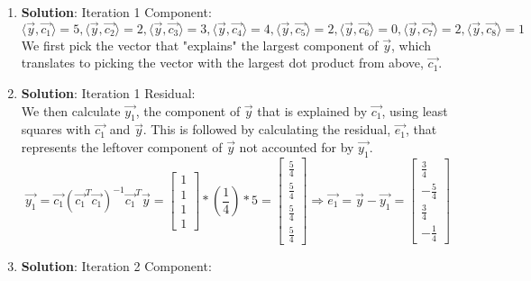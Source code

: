 \documentclass[11pt,letterpaper]{article}
\begin{document}
\begin{enumerate}
    \item \textbf{Solution}: Iteration 1 Component:
        \begin{equation*}
            \langle\vec{y},\vec{c_{1}}\rangle = 5,        \langle\vec{y},\vec{c_{2}}\rangle = 2,
            \langle\vec{y},\vec{c_{3}}\rangle = 3,
            \langle\vec{y},\vec{c_{4}}\rangle = 4,
            \langle\vec{y},\vec{c_{5}}\rangle = 2,
            \langle\vec{y},\vec{c_{6}}\rangle = 0,
            \langle\vec{y},\vec{c_{7}}\rangle = 2,
            \langle\vec{y},\vec{c_{8}}\rangle = 1
        \end{equation*}
        We first pick the vector that "explains" the largest component of $\vec{y}$, which translates to picking the vector with the largest dot product from above, $\vec{c_{1}}$.
	\item \textbf{Solution}: Iteration 1 Residual: \\
	    We then calculate $\vec{y_{1}}$, the component of $\vec{y}$ that is explained by $\vec{c_{1}}$, using least squares with $\vec{c_{1}}$ and $\vec{y}$. This is followed by calculating the residual, $\vec{e_{1}}$, that represents the leftover component of $\vec{y}$ not accounted for by $\vec{y_{1}}$.
	    \begin{equation*}
            \vec{y_{1}} = \vec{c_{1}}(\vec{c_{1}}^T\vec{c_{1}})^{-1}\vec{c_{1}}^T\vec{y} = \begin{bmatrix}
                 1 \\ 1 \\ 1 \\ 1
            \end{bmatrix} *(\frac{1}{4}) * 5
            = \begin{bmatrix}
                 \frac{5}{4} \\ \frac{5}{4} \\ \frac{5}{4} \\ \frac{5}{4}
            \end{bmatrix} \Rightarrow
            \vec{e_{1}} = \vec{y} - \vec{y_{1}} = 
            \begin{bmatrix}
                \frac{3}{4} \\ -\frac{5}{4} \\ \frac{3}{4} \\ -\frac{1}{4} 
            \end{bmatrix}
        \end{equation*}
	\item \textbf{Solution}: Iteration 2 Component: \\

\end{enumerate}
\end{document}
